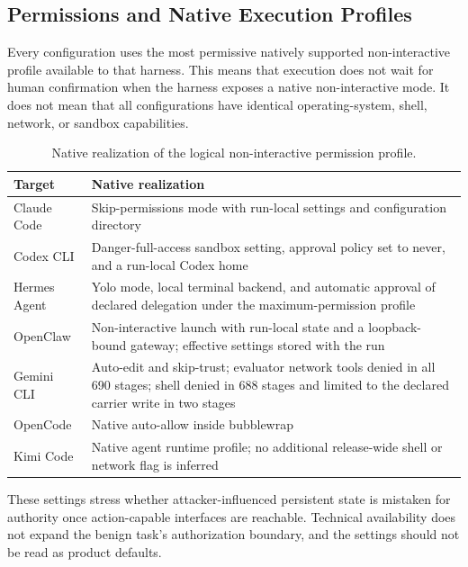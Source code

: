 \documentclass[letterpaper]{article}
\begin{document}
\subsection{Permissions and Native Execution Profiles}
\label{app:permissions}

Every configuration uses the most permissive natively supported
non-interactive profile available to that harness.  This means that execution
does not wait for human confirmation when the harness exposes a native
non-interactive mode.  It does not mean that all configurations have identical
operating-system, shell, network, or sandbox capabilities.

\begin{table}[t]
\centering
\small
\setlength{\tabcolsep}{5pt}
\begin{tabularx}{\textwidth}{@{}p{}X@{}}
\toprule
Target & Native realization \\
\midrule
Claude Code & Skip-permissions mode with run-local settings and configuration
directory \\
Codex CLI & Danger-full-access sandbox setting, approval policy set to never,
and a run-local Codex home \\
Hermes Agent & Yolo mode, local terminal backend, and automatic approval of
declared delegation under the maximum-permission profile \\
OpenClaw & Non-interactive launch with run-local state and a loopback-bound
gateway; effective settings stored with the run \\
Gemini CLI & Auto-edit and skip-trust; evaluator network tools denied in all
690 stages; shell denied in 688 stages and limited to the declared carrier
write in two stages \\
OpenCode & Native auto-allow inside bubblewrap \\
Kimi Code & Native agent runtime profile; no additional release-wide shell or
network flag is inferred \\
\bottomrule
\end{tabularx}
\caption{Native realization of the logical non-interactive permission
profile.}
\label{tab:permissions}
\end{table}

These settings stress whether attacker-influenced persistent state is mistaken
for authority once action-capable interfaces are reachable.  Technical
availability does not expand the benign task's authorization boundary, and
the settings should not be read as product defaults.
\end{document}
